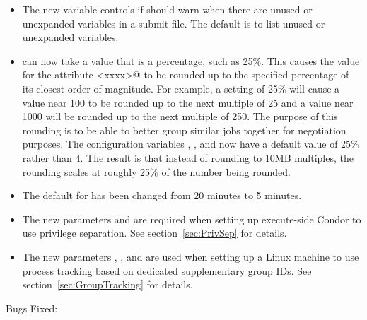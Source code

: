 \begin{itemize}
\item The new variable  
  controls if  should warn when there are unused or
  unexpanded variables in a submit file.  The default is 
  to list unused or unexpanded variables.

\item {} can now take a value that is a
percentage, such as 25\%.  This causes the value for the attribute
\verb@<xxxx>@ to be rounded up to the specified percentage of its
closest order of magnitude.  For example, a setting of 25\% will cause
a value near 100 to be rounded up to the next multiple of 25 and a
value near 1000 will be rounded up to the next multiple of 250.  The
purpose of this rounding is to be able to better group similar jobs
together for negotiation purposes.  The configuration variables
,
, and
 now have a default value of
25\% rather than 4.  The result is that instead of rounding to 10MB
multiples, the rounding scales at roughly 25\% of the number being
rounded.

\item The default for  has been changed
from 20 minutes to 5 minutes.

\item The new parameters  and
 are required when setting up execute-side
Condor to use privilege separation. See section~\ref{sec:PrivSep} for
details.

\item The new parameters ,
, and  are used
when setting up a Linux machine to use process tracking based on
dedicated supplementary group IDs. See section~\ref{sec:GroupTracking}
for details.

\end{itemize}

\noindent Bugs Fixed:

